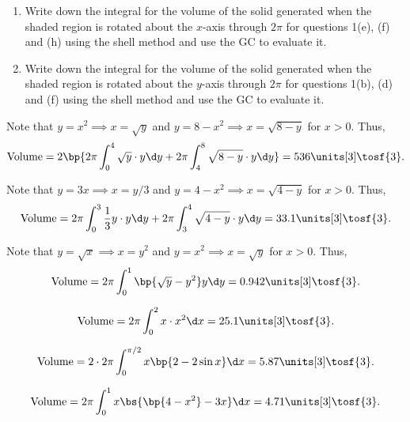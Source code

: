 \begin{problem}
    \begin{enumerate}
        \item Write down the integral for the volume of the solid generated when the shaded region is rotated about the $x$-axis through $2\pi$ for questions 1(e), (f) and (h) using the shell method and use the GC to evaluate it.
        \item Write down the integral for the volume of the solid generated when the shaded region is rotated about the $y$-axis through $2\pi$ for questions 1(b), (d) and (f) using the shell method and use the GC to evaluate it.
    \end{enumerate}
\end{problem}
\begin{solution}
    \begin{ppart}
        \begin{psubpart}
            Note that $y = x^2 \implies x = \sqrt{y}$ and $y = 8 - x^2 \implies x = \sqrt{8 - y}$ for $x > 0$. Thus, \[\volume = 2\bp{2\pi \int_0^4 \sqrt{y}\cdot y \d y + 2\pi \int_4^8 \sqrt{8-y}\cdot y \d y} = 536 \units[3] \tosf{3}.\]
        \end{psubpart}
        \begin{psubpart}
            Note that $y = 3x \implies x = y/3$ and $y = 4 - x^2 \implies x = \sqrt{4-y}$ for $x > 0$. Thus, \[\volume = 2\pi\int_0^3 \frac13 y \cdot y \d y + 2\pi\int_3^4 \sqrt{4-y}\cdot y \d y = 33.1 \units[3] \tosf{3}.\]
        \end{psubpart}
        \begin{psubpart}
            Note that $y = \sqrt{x} \implies x = y^2$ and $y = x^2 \implies x = \sqrt{y}$ for $x > 0$. Thus, \[\volume = 2\pi\int_0^1 \bp{\sqrt{y} - y^2}y \d y = 0.942 \units[3] \tosf{3}.\]
        \end{psubpart}
    \end{ppart}
    \begin{ppart}
        \begin{psubpart}
            \[\volume = 2\pi\int_0^2 x\cdot x^2 \d x = 25.1 \units[3] \tosf{3}.\]
        \end{psubpart}
        \begin{psubpart}
            \[\volume = 2 \cdot 2\pi\int_0^{\pi/2} x\bp{2 - 2\sin x} \d x = 5.87 \units[3] \tosf{3}.\]
        \end{psubpart}
        \begin{psubpart}
            \[\volume = 2\pi\int_0^1 x\bs{\bp{4-x^2} - 3x} \d x = 4.71 \units[3] \tosf{3}.\]
        \end{psubpart}
    \end{ppart}
\end{solution}

